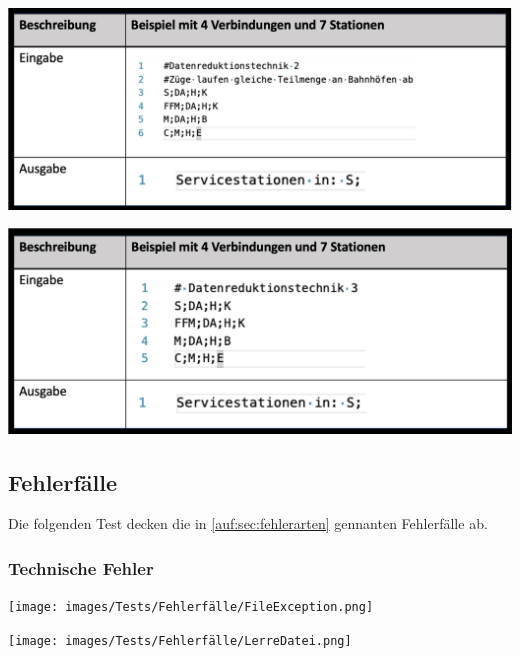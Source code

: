 \begin{center}
    \includegraphics[width=\linewidth]{images/Tests/IHK-Beispiele/Datenreduktion2.png}
    \label{test:subsecpar:Datenreduktion2}
\end{center}

\begin{center}
    \includegraphics[width=\linewidth]{images/Tests/IHK-Beispiele/Datenreduktion3.png}
    \label{test:subsecpar:Datenreduktion3}
\end{center}


\subsection{Fehlerfälle}\label{test:sec:fehlerfaelle}
Die folgenden Test decken die in \ref{auf:sec:fehlerarten} gennanten Fehlerfälle ab.

\subsubsection{Technische Fehler}\label{test:sec:technische-fehler}
\begin{center}
    \texttt{[image: images/Tests/Fehlerfälle/FileException.png]}
    \label{test:subsecpar:einlese-fehler}
\end{center}

\begin{center}
    \texttt{[image: images/Tests/Fehlerfälle/LerreDatei.png]}
    \label{test:subsecpar:leere-datei}
\end{center}


